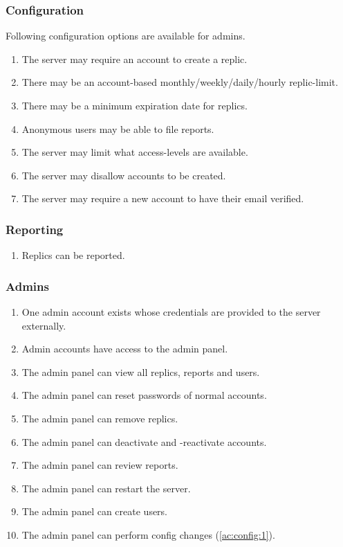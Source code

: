 \subsubsection{Configuration}
Following configuration options are available for admins.
\begin{enumerate}[label=\textit{AC \arabic*}, resume]
    \item \label{ac:config:1} The server may require an account to create a replic.
    \item \label{ac:config:2} There may be an account-based monthly/weekly/daily/hourly replic-limit.
    \item \label{ac:config:3} There may be a minimum expiration date for replics.
    \item \label{ac:config:4} Anonymous users may be able to file reports.
    \item \label{ac:config:5} The server may limit what access-levels are available.
    \item \label{ac:config:6} The server may disallow accounts to be created.
    \item \label{ac:config:7} The server may require a new account to have their email verified.
\end{enumerate}

\subsubsection{Reporting}
\begin{enumerate}[label=\textit{AC \arabic*}, resume]
    \item \label{ac:reports:1} Replics can be reported.
\end{enumerate}

\subsubsection{Admins}
\begin{enumerate}[label=\textit{AC \arabic*}, resume]
    \item \label{ac:admins:1} One admin account exists whose credentials are provided to the server externally.
    \item \label{ac:admins:2} Admin accounts have access to the admin panel.
    \item \label{ac:admins:3} The admin panel can view all replics, reports and users.
    \item \label{ac:admins:4} The admin panel can reset passwords of normal accounts.
    \item \label{ac:admins:5} The admin panel can remove replics.
    \item \label{ac:admins:6} The admin panel can deactivate and -reactivate accounts.
    \item \label{ac:admins:7} The admin panel can review reports.
    \item \label{ac:admins:8} The admin panel can restart the server.
    \item \label{ac:admins:9} The admin panel can create users.
    \item \label{ac:admins:10} The admin panel can perform config changes (\ref{ac:config:1}).
\end{enumerate}


